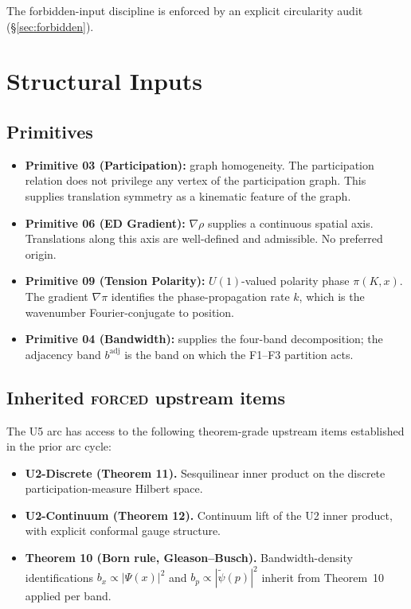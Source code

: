 \documentclass[11pt,a4paper]{article}
\begin{document}
The forbidden-input discipline is enforced by an explicit circularity audit (\S\ref{sec:forbidden}).

\section{Structural Inputs}\label{sec:inputs}

\subsection{Primitives}

\begin{itemize}
  \item \textbf{Primitive 03 (Participation):} graph homogeneity. The participation relation does not privilege any vertex of the participation graph. This supplies translation symmetry as a kinematic feature of the graph.
  \item \textbf{Primitive 06 (ED Gradient):} $\nabla \rho$ supplies a continuous spatial axis. Translations along this axis are well-defined and admissible. No preferred origin.
  \item \textbf{Primitive 09 (Tension Polarity):} $U(1)$-valued polarity phase $\pi(K, x)$. The gradient $\nabla \pi$ identifies the phase-propagation rate $k$, which is the wavenumber Fourier-conjugate to position.
  \item \textbf{Primitive 04 (Bandwidth):} supplies the four-band decomposition; the adjacency band $b^{\mathrm{adj}}$ is the band on which the F1--F3 partition acts.
\end{itemize}

\subsection{Inherited \textsc{forced} upstream items}

The U5 arc has access to the following theorem-grade upstream items established in the prior arc cycle:

\begin{itemize}
  \item \textbf{U2-Discrete (Theorem 11).} Sesquilinear inner product on the discrete participation-measure Hilbert space.
  \item \textbf{U2-Continuum (Theorem 12).} Continuum lift of the U2 inner product, with explicit conformal gauge structure.
  \item \textbf{Theorem 10 (Born rule, Gleason--Busch).} Bandwidth-density identifications $b_x \propto |\Psi(x)|^2$ and $b_p \propto |\widetilde{\psi}(p)|^2$ inherit from Theorem~10 applied per band.
\end{itemize}
\end{document}
